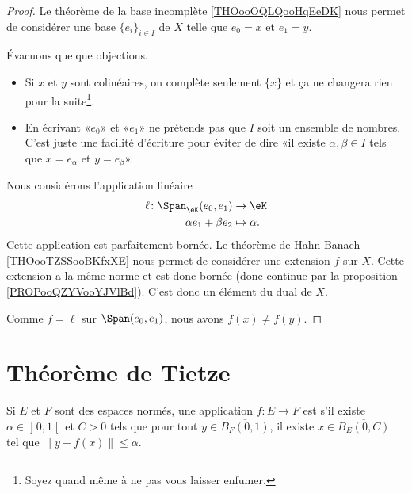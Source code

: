 \begin{proof}
    Le théorème de la base incomplète \ref{THOooOQLQooHqEeDK} nous permet de considérer une base \( \{ e_i \}_{i\in I}\) de \( X\) telle que \( e_0=x\) et \( e_1=y\).

    Évacuons quelque objections.
    \begin{itemize}
        \item Si \( x\) et \( y\) sont colinéaires, on complète seulement \( \{ x \}\) et ça ne changera rien pour la suite\footnote{Soyez quand même  à ne pas vous laisser enfumer.}.
        \item En écrivant «\( e_0\)» et «\( e_1\)»  ne prétends pas que \( I\) soit un ensemble de nombres. C'est juste une facilité d'écriture pour éviter de dire «il existe \( \alpha,\beta\in I\) tels que \( x=e_{\alpha}\) et \( y=e_{\beta}\)».
    \end{itemize}
    Nous considérons l'application linéaire
    \begin{equation}
        \begin{aligned}
            \ell\colon \Span_{\eK}(e_0,e_1)&\to \eK \\
            \alpha e_1+\beta e_2&\mapsto \alpha. 
        \end{aligned}
    \end{equation}
    Cette application est parfaitement bornée. Le théorème de Hahn-Banach \ref{THOooTZSSooBKfxXE} nous permet de considérer une extension \( f\) sur \( X\). Cette extension a la même norme et est donc bornée (donc continue par la proposition \ref{PROPooQZYVooYJVlBd}). C'est donc un élément du dual de \( X\).

    Comme \( f=\ell\) sur \( \Span(e_0,e_1)\), nous avons \( f(x)\neq f(y)\).
\end{proof}

\section{Théorème de Tietze}

\begin{definition}
Si \( E\) et \( F\) sont des espaces normés, une application \( f\colon E\to F\) est  s'il existe \( \alpha\in\mathopen] 0 , 1 \mathclose[\) et \( C>0\) tels que pour tout \( y\in \overline{ B_F(0,1) }\), il existe \( x\in\overline{ B_E(0,C) }\) tel que \( \| y-f(x) \|\leq \alpha\).
\end{definition}

